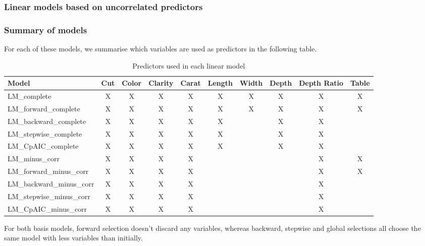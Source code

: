 \documentclass[
  paper=a4,
  ,captions=tableheading
]{scrartcl}
\begin{document}
\hypertarget{linear-models-based-on-uncorrelated-predictors}{%
\subsubsection{Linear models based on uncorrelated
predictors}\label{linear-models-based-on-uncorrelated-predictors}}

\hypertarget{summary-of-models}{%
\subsubsection{Summary of models}\label{summary-of-models}}

For each of these models, we summarise which variables are used as
predictors in the following table.

\begin{table}

\caption{\label{tab:Variable Selection Summary}Predictors used in each linear model}
\centering
\begin{tabular}[t]{l|c|c|c|c|c|c|c|c|c}
\hline
Model & Cut & Color & Clarity & Carat & Length & Width & Depth & Depth Ratio & Table\\
\hline
LM\_complete & X & X & X & X & X & X & X & X & X\\
\hline
LM\_forward\_complete & X & X & X & X & X & X & X & X & X\\
\hline
LM\_backward\_complete & X & X & X & X & X &  & X & X & \\
\hline
LM\_stepwise\_complete & X & X & X & X & X &  & X & X & \\
\hline
LM\_CpAIC\_complete & X & X & X & X & X &  & X & X & \\
\hline
LM\_minus\_corr & X & X & X & X &  &  &  & X & X\\
\hline
LM\_forward\_minus\_corr & X & X & X & X &  &  &  & X & X\\
\hline
LM\_backward\_minus\_corr & X & X & X & X &  &  &  & X & \\
\hline
LM\_stepwise\_minus\_corr & X & X & X & X &  &  &  & X & \\
\hline
LM\_CpAIC\_minus\_corr & X & X & X & X &  &  &  & X & \\
\hline
\end{tabular}
\end{table}

For both basis models, forward selection doesn't discard any variables,
whereas backward, stepwise and global selections all choose the same
model with less variables than initially.
\end{document}
